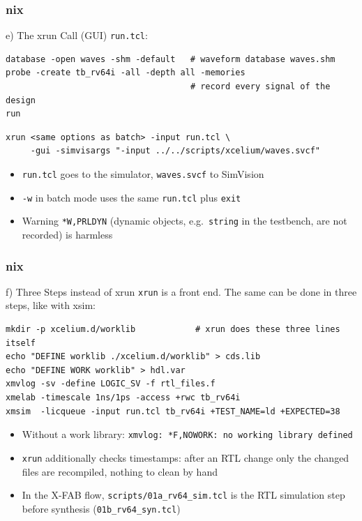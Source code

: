 \documentclass{beamer}
\newcommand{\astitle}{nix}
\newcommand{\assubtitle}{nix}
\newcommand{\cmd}[1]{\texttt{#1}}
\begin{document}
\renewcommand{\assubtitle}{e) The xrun Call (GUI)}
\begin{frame}[fragile]
\frametitle{\astitle}
\begin{block}{\assubtitle}
  \cmd{run.tcl}:
\begin{lstlisting}[style=sh]
database -open waves -shm -default   # waveform database waves.shm
probe -create tb_rv64i -all -depth all -memories
                                     # record every signal of the design
run
\end{lstlisting}
\begin{lstlisting}[style=sh]
xrun <same options as batch> -input run.tcl \
     -gui -simvisargs "-input ../../scripts/xcelium/waves.svcf"
\end{lstlisting}
  \begin{itemize}
    \item \cmd{run.tcl} goes to the simulator, \cmd{waves.svcf} to SimVision
    \item \cmd{-w} in batch mode uses the same \cmd{run.tcl} plus \cmd{exit}
    \item Warning \cmd{*W,PRLDYN} (dynamic objects, e.g.\ \cmd{string}
      in the testbench, are not recorded) is harmless
  \end{itemize}
\end{block}
\end{frame}

\renewcommand{\assubtitle}{f) Three Steps instead of xrun}
\begin{frame}[fragile]
\frametitle{\astitle}
\begin{block}{\assubtitle}
  \cmd{xrun} is a front end. The same can be done in three steps, like with xsim:
\begin{lstlisting}[style=sh]
mkdir -p xcelium.d/worklib            # xrun does these three lines itself
echo "DEFINE worklib ./xcelium.d/worklib" > cds.lib
echo "DEFINE WORK worklib" > hdl.var
xmvlog -sv -define LOGIC_SV -f rtl_files.f
xmelab -timescale 1ns/1ps -access +rwc tb_rv64i
xmsim  -licqueue -input run.tcl tb_rv64i +TEST_NAME=ld +EXPECTED=38
\end{lstlisting}
  \begin{itemize}
    \item Without a work library: \cmd{xmvlog: *F,NOWORK: no working library defined}
    \item \cmd{xrun} additionally checks timestamps: after an RTL change only
      the changed files are recompiled, nothing to clean by hand
    \item In the X-FAB flow, \cmd{scripts/01a\_rv64\_sim.tcl} is the
      RTL simulation step before synthesis (\cmd{01b\_rv64\_syn.tcl})
  \end{itemize}
\end{block}
\end{frame}
\end{document}
